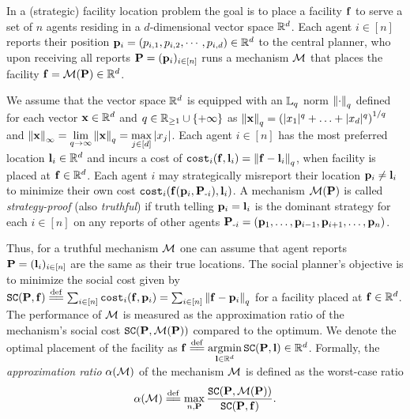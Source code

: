 In a (strategic) facility location problem the goal is to place a facility $\facility$ to serve a set of $n$ agents residing in a 
$d$-dimensional vector space $\reals^d$. Each agent $i\in[n]$ reports their position $\loci=(p_{i,1},p_{i,2},\cdots,p_{i,d})\in \reals^d$ to the central planner, who upon receiving all reports $\locs=(\loci)_{i\in[n]}$ runs a mechanism $\mech$ that places the facility  $\facility=\mech(\locs)\in\reals^d$. 

We assume that the vector space $\reals^d$ is equipped with an $\lqnorm$ norm $\qnorm{\cdot}$ defined for each vector $\vx\in\reals^d$ and   $q\in\reals_{\ge 1}\cup\{+\infty\}$ as 
$
\qnorm{\vx}=\left(|x_1|^q+\ldots+|x_d|^q\right)^{1/q}
$ and $\qnorm[\infty]{\vx}=\lim\limits_{q\to\infty}\qnorm{\vx}=\max\limits_{j\in[d]}|x_j|$.  Each agent $i\in [n]$ has the most preferred location $\vli\in\reals^d$ and incurs a cost of $\costi(\facility,\vli)=\qnorm{\facility-\vli}$, when facility is placed at $\facility\in\reals^d$. Each agent $i$ may strategically misreport their location $\loci\ne\vli$ to minimize their own cost $\costi(\facility(\loci,\locsmi),\vli)$. A mechanism $\mech(\locs)$ is called \emph{strategy-proof} (also  \emph{truthful}) if truth telling $\loci=\vli$ is the dominant strategy for each $i\in[n]$ on any reports of other agents $\locsmi=(\loci[1],\ldots,\loci[i-1],\loci[i+1],\ldots,\loci[n])$.  

Thus, for a truthful mechanism $\mech$ one can assume that agent reports $\locs=(\vli)_{i\in[n]}$ are the same as their true locations. The social planner's objective is to minimize the social cost given by $\SC(\locs,\facility)\eqdef\sum_{i\in[n]}\costi(\facility,\loci)=\sum_{i\in[n]}\qnorm{\facility-\loci}$ for a facility placed at $\facility\in\reals^d$.
The performance of $\mech$ is measured as the approximation ratio of the mechanism's social cost $\SC(\locs,\mech(\locs))$ compared to the optimum. We denote the optimal placement of the facility as $\facility\eqdef\argmin\limits_{\vl\in\reals^d}\SC(\locs,\vl)\in\reals^d$. Formally, the \emph{approximation ratio} $\alpha(\mech)$ of the mechanism $\mech$ is defined as the worst-case ratio
\[
\alpha(\mech) \eqdef
\max\limits_{n,\locs}
\frac{\SC(\locs,\mech(\locs))}{\SC(\locs,\facility)}.
\]

